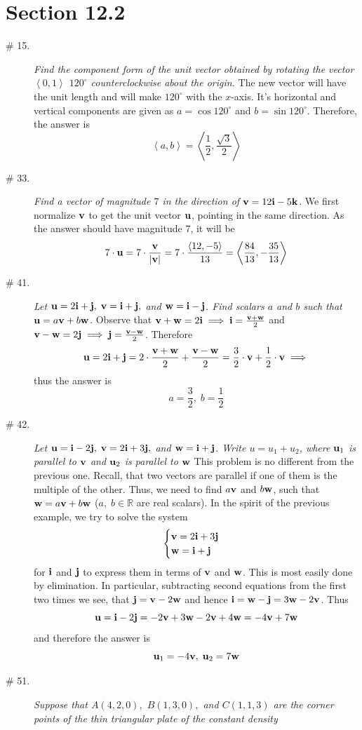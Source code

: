 \documentclass[8pt]{article} %
\begin{document}
\section{Section 12.2}
\begin{description}
\item[\# 15.]{{\it Find the component form of the unit vector obtained by rotating the vector $\left<0,1\right>$ $120^\circ$ counterclockwise
	about the origin.}
	The new vector will have the unit length and will make $120^\circ$ with the $x$-axis. It's horizontal and vertical components are given
	as $a=\cos120^\circ$ and $b=\sin120^\circ$. Therefore, the answer is
	\[\left<a,b\right>=\left<\frac{1}{2},\frac{\sqrt{3}}{2}\right>\]
	}
\item[\# 33.]{{\it Find a vector of magnitude $7$ in the direction of $\mathbf{v}=12\mathbf{i}-5\mathbf{k}$.}
	We first normalize $\mathbf{v}$ to get the unit vector $\mathbf{u}$, pointing in the same direction. As the answer should have magnitude 7, it will be
	\[7\cdot\mathbf{u}=7\cdot\frac{\mathbf{v}}{\left|\mathbf{v}\right|}=7\cdot\frac{\left<12,-5\right>}{13}=\left<\frac{84}{13},-\frac{35}{13}\right>\]
	}
\item[\# 41.]{{\it Let $\mathbf{u}=2\mathbf{i}+\mathbf{j},\;\mathbf{v}=\mathbf{i}+\mathbf{j},$ and $\mathbf{w}=\mathbf{i}-\mathbf{j}$. Find scalars $a$ and $b$ such that $\mathbf{u}=a\mathbf{v}+b\mathbf{w}$.}
	Observe that $\mathbf{v}+\mathbf{w}=2\mathbf{i}\implies\mathbf{i}=\frac{\mathbf{v}+\mathbf{w}}{2}$ and $\mathbf{v}-\mathbf{w}=2\mathbf{j}\implies\mathbf{j}=\frac{\mathbf{v}-\mathbf{w}}{2}$. Therefore
	\[\mathbf{u}=2\mathbf{i}+\mathbf{j}=2\cdot\frac{\mathbf{v}+\mathbf{w}}{2}+\frac{\mathbf{v}-\mathbf{w}}{2}=\frac{3}{2}\cdot\mathbf{v}+\frac{1}{2}\cdot\mathbf{v}\implies\]
	thus the answer is
	\[a=\frac{3}{2},\;b=\frac{1}{2}\]
	}
\item[\# 42.]{{\it Let $\mathbf{u}=\mathbf{i}-2\mathbf{j},\;\mathbf{v}=2\mathbf{i}+3\mathbf{j},$ and $\mathbf{w}=\mathbf{i}+\mathbf{j}$. Write $u=u_1+u_2$, where $\mathbf{u}_1$ is parallel to $\mathbf{v}$ and
	$\mathbf{u}_2$ is parallel to $\mathbf{w}$}
	This problem is no different from the previous one. Recall, that two vectors are parallel if one of them is the multiple of the other. Thus,
	we need to find $a\mathbf{v}$ and $b\mathbf{w}$, such that $\mathbf{w}=a\mathbf{v}+b\mathbf{w}$ ($a,\;b\in\mathbb{R}$ are real scalars). In the spirit of the previous example,
	we try to solve the system
	\[\begin{cases}\mathbf{v}=2\mathbf{i}+3\mathbf{j}\\\mathbf{w}=\mathbf{i}+\mathbf{j}\end{cases}\]
	for $\mathbf{i}$ and $\mathbf{j}$ to express them in terms of $\mathbf{v}$ and $\mathbf{w}$. This is most easily done by elimination. In particular, subtracting
	second equations from the first two times we see, that $\mathbf{j}=\mathbf{v}-2\mathbf{w}$ and hence $\mathbf{i}=\mathbf{w}-\mathbf{j}=3\mathbf{w}-2\mathbf{v}$. Thus
	\[\mathbf{u}=\mathbf{i}-2\mathbf{j}=-2\mathbf{v}+3\mathbf{w}-2\mathbf{v}+4\mathbf{w}=-4\mathbf{v}+7\mathbf{w}\]and therefore the answer is
	\[\mathbf{u}_1=-4\mathbf{v},\;\mathbf{u}_2=7\mathbf{w}\]
	}
\item[\# 51.]{{\it Suppose that $A(4,2,0),$ $B(1,3,0),$ and $C(1,1,3)$ are the corner points of the thin triangular plate of the constant density
}}
\end{description}
\end{document}
